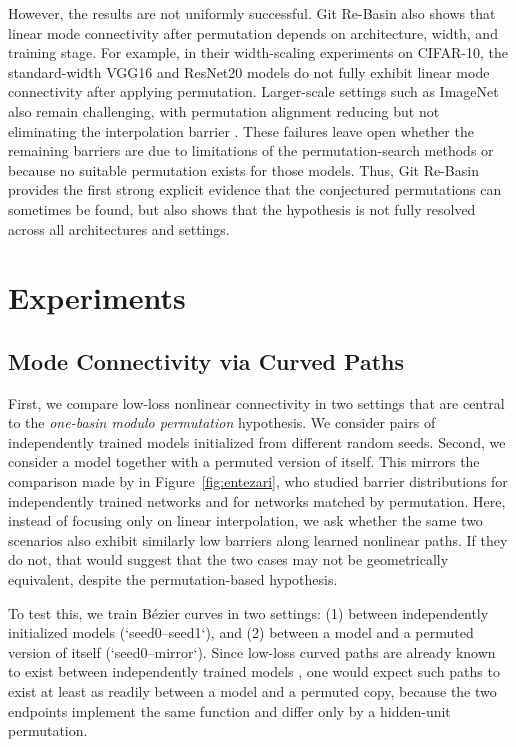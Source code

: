 \documentclass[11pt,a4paper]{report}
\begin{document}
However, the results are not uniformly successful. Git Re-Basin also shows that
linear mode connectivity after permutation depends on architecture, width, and
training stage. For example, in their width-scaling experiments on CIFAR-10, the
standard-width VGG16 and ResNet20 models do not fully exhibit linear mode
connectivity after applying permutation. Larger-scale settings such as
ImageNet also remain challenging, with permutation alignment reducing but not
eliminating the interpolation barrier \citep{ainsworth2023git}. These failures
leave open whether the remaining barriers are due to limitations of the
permutation-search methods or because no suitable permutation exists for those
models. Thus, Git Re-Basin provides the first strong explicit evidence that the
conjectured permutations can sometimes be found, but also shows that the
hypothesis is not fully resolved across all architectures and settings.


\chapter{Experiments}


\section{Mode Connectivity via Curved Paths}

First, we compare low-loss nonlinear connectivity in two settings that are central to the \textit{one-basin modulo permutation} hypothesis. We consider pairs of independently trained models initialized from different random seeds. Second, we consider a model together with a permuted version of itself. This mirrors the comparison made by \citep{entezari2021role} in Figure~\ref{fig:entezari}, who studied barrier distributions for independently trained networks and for networks matched by permutation. Here, instead of focusing only on linear interpolation, we ask whether the same two scenarios also exhibit similarly low barriers along learned nonlinear paths. If they do not, that would suggest that the two cases may not be geometrically equivalent, despite the permutation-based hypothesis.

To test this, we train Bézier curves in two settings: (1) between independently initialized models (`seed0--seed1`), and (2) between a model and a permuted version of itself (`seed0--mirror`). Since low-loss curved paths are already known to exist between independently trained models \citep{garipov2018loss}, one would expect such paths to exist at least as readily between a model and a permuted copy, because the two endpoints implement the same function and differ only by a hidden-unit permutation. 
\end{document}
